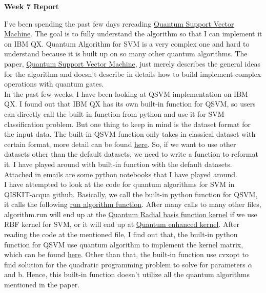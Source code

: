 \documentclass[12pt]{article}
\begin{document}
\begin{center}
\textbf{\Large Week 7 Report} \\
\end{center}

I've been spending the past few days rereading \href{https://arxiv.org/abs/1307.0471}{Quantum Support Vector Machine}. The goal is to fully understand the algorithm so that I can implement it on IBM QX. Quantum Algorithm for SVM is a very complex one and hard to understand because it is built up on so many other quantum algorithms. The paper, \href{https://arxiv.org/abs/1307.0471}{Quantum Support Vector Machine}, just merely describes the general ideas for the algorithm and doesn't describe in details how to build implement complex operations with quantum gates. \\

In the past few weeks, I have been looking at QSVM implementation on IBM QX. I found out that IBM QX has its own built-in function for QSVM, so users can directly call the built-in function from python and use it for SVM classification problem. But one thing to keep in mind is the dataset format for the input data. The built-in QSVM function only takes in classical dataset with certain format, more detail can be found \href{https://github.com/Qiskit/qiskit-acqua-tutorials/blob/master/artificial_intelligence/datasets.py}{here}. So, if we want to use other datasets other than the default datasets, we need to write a function to reformat it. I have played around with built-in function with the default datasets. Attached in emails are some python notebooks that I have played around. \\

I have attempted to look at the code for quantum algorithms for SVM in QISKIT-acqua github. Basically, we call the built-in python function for QSVM, it calls the following \href{https://github.com/Qiskit/qiskit-acqua/blob/master/qiskit_acqua/algomethods.py}{run algorithm function}. After many calls to many other files, algorithm.run will end up at the \href{https://github.com/Qiskit/qiskit-acqua/blob/master/qiskit_acqua/classicalsvm/svm_rbf_kernel.py}{Quantum Radial basis function kernel} if we use RBF kernel for SVM, or it will end up at \href{https://github.com/Qiskit/qiskit-acqua/blob/master/qiskit_acqua/svm/svm_qkernel.py}{Quantum enhanced kernel}. After reading the code at the mentioned file, I find out that, the built-in python function for QSVM use quantum algorithm to implement the kernel matrix, which can be found \href{https://github.com/Qiskit/qiskit-acqua/blob/master/qiskit_acqua/svm/quantum_circuit_kernel.py}{here}. Other than that, the built-in function use cvxopt to find solution for the quadratic programming problem to solve for parameters $\alpha$ and b. Hence, this built-in function doesn't utilize all the quantum algorithms mentioned in the paper. \\
\end{document}
